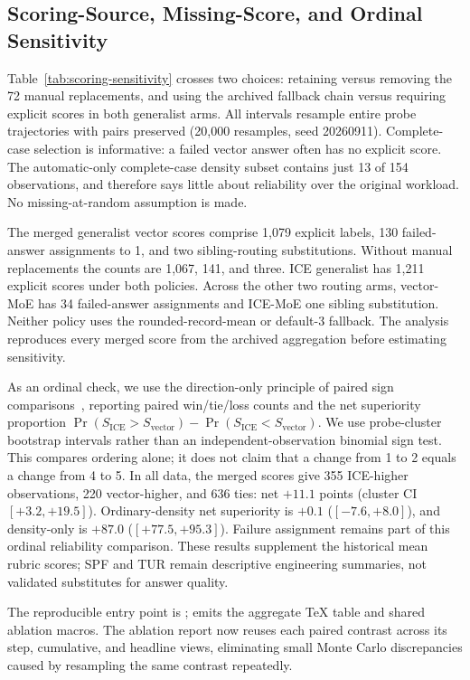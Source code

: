\documentclass[11pt,a4paper]{article}
\begin{document}
\subsection{Scoring-Source, Missing-Score, and Ordinal Sensitivity}
\label{app:scoring}
Table~\ref{tab:scoring-sensitivity} crosses two choices: retaining versus removing the 72 manual replacements, and using the archived fallback chain versus requiring explicit scores in both generalist arms. All intervals resample entire probe trajectories with pairs preserved (20,000 resamples, seed 20260911). Complete-case selection is informative: a failed vector answer often has no explicit score. The automatic-only complete-case density subset contains just 13 of 154 observations, and therefore says little about reliability over the original workload. No missing-at-random assumption is made.

\begin{table}[htbp]
\centering\small
\caption{ICE v2 minus vector generalist under alternative scoring policies. ``Archived'' includes failure assignment and fallback; ``complete'' requires two explicit scores. These are sensitivity analyses of recorded outcomes, not new model runs.}
\label{tab:scoring-sensitivity}

\end{table}

The merged generalist vector scores comprise 1,079 explicit labels, 130 failed-answer assignments to 1, and two sibling-routing substitutions. Without manual replacements the counts are 1,067, 141, and three. ICE generalist has 1,211 explicit scores under both policies. Across the other two routing arms, vector-MoE has 34 failed-answer assignments and ICE-MoE one sibling substitution. Neither policy uses the rounded-record-mean or default-3 fallback. The analysis reproduces every merged score from the archived aggregation before estimating sensitivity.

As an ordinal check, we use the direction-only principle of paired sign comparisons~\citep{nistSignTest}, reporting paired win/tie/loss counts and the net superiority proportion $\Pr(S_{\mathrm{ICE}}>S_{\mathrm{vector}})-\Pr(S_{\mathrm{ICE}}<S_{\mathrm{vector}})$. We use probe-cluster bootstrap intervals rather than an independent-observation binomial sign test. This compares ordering alone; it does not claim that a change from 1 to 2 equals a change from 4 to 5. In all data, the merged scores give 355 ICE-higher observations, 220 vector-higher, and 636 ties: net $+11.1$ points (cluster CI $[+3.2,+19.5]$). Ordinary-density net superiority is $+0.1$ ($[-7.6,+8.0]$), and density-only is $+87.0$ ($[+77.5,+95.3]$). Failure assignment remains part of this ordinal reliability comparison. These results supplement the historical mean rubric scores; SPF and TUR remain descriptive engineering summaries, not validated substitutes for answer quality.

The reproducible entry point is ;  emits the aggregate TeX table and shared ablation macros. The ablation report now reuses each paired contrast across its step, cumulative, and headline views, eliminating small Monte Carlo discrepancies caused by resampling the same contrast repeatedly.
\end{document}
